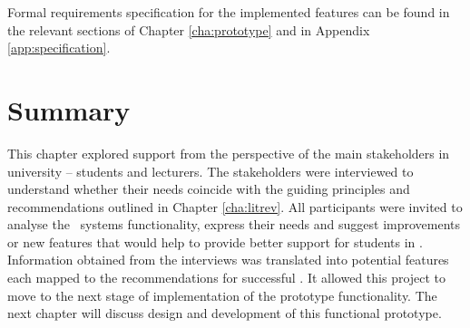 Formal requirements specification for the implemented features can be found in
the relevant sections of Chapter \ref{cha:prototype} and in Appendix
\ref{app:specification}.

\section{Summary}

This chapter explored \LLLs support from the perspective of the main
stakeholders in university -- students and lecturers. The stakeholders were
interviewed to understand whether their needs coincide with the guiding
principles and recommendations outlined in Chapter \ref{cha:litrev}. All
participants were invited to analyse the \ep~systems functionality, express
their needs and suggest improvements or new features that would help to provide
better support for students in \LLLsn. Information obtained from the interviews
was translated into potential features each mapped to the recommendations for
successful \LLLsn. It allowed this project to move to the next stage of
implementation of the prototype functionality. The next chapter will discuss
design and development of this functional prototype.
